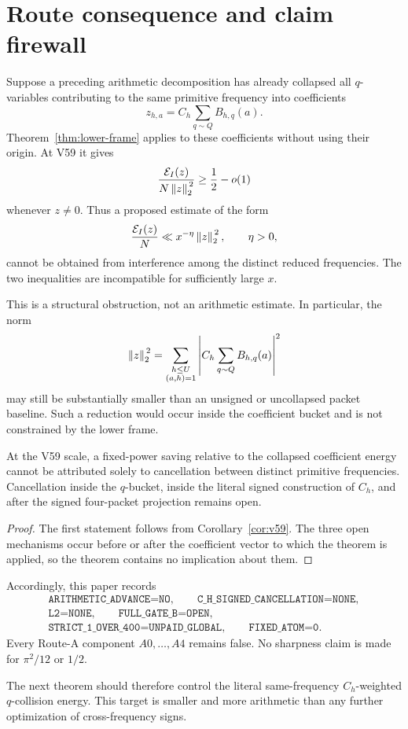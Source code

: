 \section{Route consequence and claim firewall}
\label{sec:route}

Suppose a preceding arithmetic decomposition has already collapsed all
\(q\)-variables contributing to the same primitive frequency into coefficients
\[
z_{h,a}=C_h\sum_{q\sim Q}B_{h,q}(a).
\]
Theorem~\ref{thm:lower-frame} applies to these coefficients without using
their origin.  At V59 it gives
\[
\frac{\mathcal{E}_I(z)}{N\left\lVert z\right\rVert_{2}^{\,2}}\geq\frac12-o(1)
\]
whenever \(z\ne0\).  Thus a proposed estimate of the form
\[
\frac{\mathcal{E}_I(z)}{N}\ll x^{-\eta}\left\lVert z\right\rVert_{2}^{\,2},
\qquad \eta>0,
\]
cannot be obtained from interference among the distinct reduced frequencies.
The two inequalities are incompatible for sufficiently large \(x\).

This is a structural obstruction, not an arithmetic estimate.  In particular,
the norm
\[
\left\lVert z\right\rVert_{2}^{\,2}
=\sum_{\substack{h\leq U\\(a,h)=1}}
\left|C_h\sum_{q\sim Q}B_{h,q}(a)\right|^2
\]
may still be substantially smaller than an unsigned or uncollapsed packet
baseline.  Such a reduction would occur inside the coefficient bucket and is
not constrained by the lower frame.

\begin{proposition}
At the V59 scale, a fixed-power saving relative to the collapsed coefficient
energy cannot be attributed solely to cancellation between distinct primitive
frequencies.  Cancellation inside the \(q\)-bucket, inside the literal signed
construction of \(C_h\), and after the signed four-packet projection remains
open.
\end{proposition}

\begin{proof}
The first statement follows from Corollary~\ref{cor:v59}.  The three open
mechanisms occur before or after the coefficient vector to which the theorem
is applied, so the theorem contains no implication about them.
\end{proof}

Accordingly, this paper records
\[
\begin{gathered}
\texttt{ARITHMETIC\_ADVANCE=NO},\qquad
\texttt{C\_H\_SIGNED\_CANCELLATION=NONE},\\
\texttt{L2=NONE},\qquad
\texttt{FULL\_GATE\_B=OPEN},\\
\texttt{STRICT\_1\_OVER\_400=UNPAID\_GLOBAL},\qquad
\texttt{FIXED\_ATOM=0}.
\end{gathered}
\]
Every Route-A component \(A0,\ldots,A4\) remains false.  No sharpness claim is
made for \(\pi^2/12\) or \(1/2\).

The next theorem should therefore control the literal same-frequency
\(C_h\)-weighted \(q\)-collision energy.  This target is smaller and more
arithmetic than any further optimization of cross-frequency signs.
